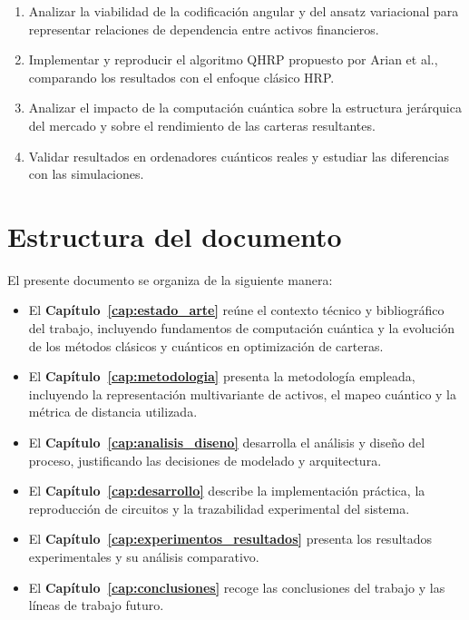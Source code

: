 \begin{enumerate}
\item Analizar la viabilidad de la codificación angular y del ansatz variacional para representar relaciones de dependencia entre activos financieros.
\item Implementar y reproducir el algoritmo \gls{QHRP} propuesto por Arian et al.\cite{arian2025qhrp}, comparando los resultados con el enfoque clásico \gls{HRP}.
\item Analizar el impacto de la computación cuántica sobre la estructura jerárquica del mercado y sobre el rendimiento de las carteras resultantes.
\item Validar resultados en ordenadores cuánticos reales y estudiar las diferencias con las simulaciones.
\end{enumerate}


\section{Estructura del documento}
\label{sec:estructura_documento}

El presente documento se organiza de la siguiente manera:

\begin{itemize}
\item El \textbf{Capítulo~\ref{cap:estado_arte}} reúne el contexto técnico y bibliográfico del trabajo, incluyendo fundamentos de computación cuántica y la evolución de los métodos clásicos y cuánticos en optimización de carteras.
\item El \textbf{Capítulo~\ref{cap:metodologia}} presenta la metodología empleada, incluyendo la representación multivariante de activos, el mapeo cuántico y la métrica de distancia utilizada.
\item El \textbf{Capítulo~\ref{cap:analisis_diseno}} desarrolla el análisis y diseño del proceso, justificando las decisiones de modelado y arquitectura.
\item El \textbf{Capítulo~\ref{cap:desarrollo}} describe la implementación práctica, la reproducción de circuitos y la trazabilidad experimental del sistema.
\item El \textbf{Capítulo~\ref{cap:experimentos_resultados}} presenta los resultados experimentales y su análisis comparativo.
\item El \textbf{Capítulo~\ref{cap:conclusiones}} recoge las conclusiones del trabajo y las líneas de trabajo futuro.
\end{itemize}
